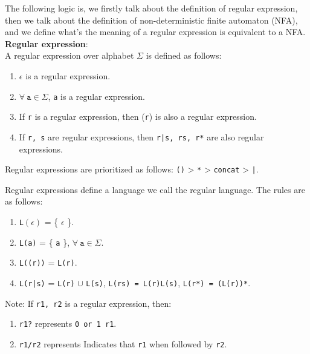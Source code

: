 \documentclass{article}
\begin{document}
The following logic is, we firstly talk about the definition
of regular expression, then we talk about the definition of 
non-deterministic finite automaton (NFA), and we define what's the meaning
of a regular expression is equivalent to a NFA.\@
\\

\textbf{Regular expression}:
\\

A regular expression over alphabet \( \Sigma \) is defined as follows:

\begin{enumerate}
    \item \( \epsilon \) is a regular expression.
    \item \( \forall\ \texttt{a} \in \Sigma \), \texttt{a} is a regular expression.
    \item If \texttt{r} is a regular expression, then (\texttt{r}) is also a regular expression.
    \item If \texttt{r, s} are regular expressions, then \texttt{r|s, rs, r*} are also regular expressions.
\end{enumerate}

Regular expressions are prioritized as follows: \texttt{()} > \texttt{*} > \texttt{concat} > \texttt{|}.

Regular expressions define a language we call the regular language. The rules are as follows:

\begin{enumerate}
    \item \texttt{L\((\epsilon)\)} = \{ \( \epsilon \) \}.
    \item \texttt{L{(a)}} = \{ \texttt{a} \}, \( \forall\ \texttt{a} \in \Sigma \).
    \item \texttt{L{((r))}} = \texttt{L{(r)}}.
    \item \texttt{L{(r|s)}} = \texttt{L{(r)}} \( \cup \) \texttt{L{(s)}}, \texttt{L{(rs)} = L{(r)}L{(s)}}, \texttt{L{(r*)} = (L{(r)})*}.
\end{enumerate}

Note: If \texttt{r1, r2} is a regular expression, then:

\begin{enumerate}
    \item \texttt{r1?} represents \texttt{0 or 1 r1}.
    \item \texttt{r1/r2} represents Indicates that \texttt{r1} when followed by \texttt{r2}.
\end{enumerate}
\end{document}
